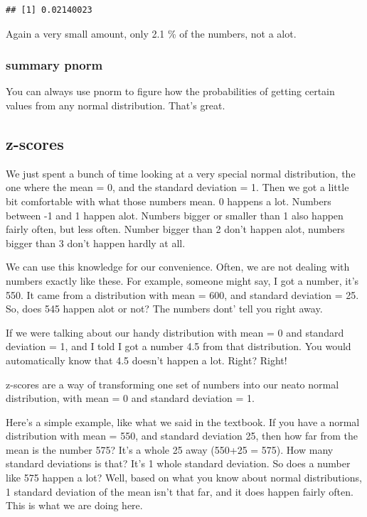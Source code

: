 \documentclass[]{book}
\theoremstyle{definition}
\theoremstyle{definition}
\theoremstyle{definition}
\theoremstyle{remark}
\begin{document}
\begin{verbatim}
## [1] 0.02140023
\end{verbatim}

Again a very small amount, only 2.1 \% of the numbers, not a alot.

\subsubsection{summary pnorm}\label{summary-pnorm}

You can always use pnorm to figure how the probabilities of getting
certain values from any normal distribution. That's great.

\subsection{z-scores}\label{z-scores}

We just spent a bunch of time looking at a very special normal
distribution, the one where the mean = 0, and the standard deviation =
1. Then we got a little bit comfortable with what those numbers mean. 0
happens a lot. Numbers between -1 and 1 happen alot. Numbers bigger or
smaller than 1 also happen fairly often, but less often. Number bigger
than 2 don't happen alot, numbers bigger than 3 don't happen hardly at
all.

We can use this knowledge for our convenience. Often, we are not dealing
with numbers exactly like these. For example, someone might say, I got a
number, it's 550. It came from a distribution with mean = 600, and
standard deviation = 25. So, does 545 happen alot or not? The numbers
dont' tell you right away.

If we were talking about our handy distribution with mean = 0 and
standard deviation = 1, and I told I got a number 4.5 from that
distribution. You would automatically know that 4.5 doesn't happen a
lot. Right? Right!

z-scores are a way of transforming one set of numbers into our neato
normal distribution, with mean = 0 and standard deviation = 1.

Here's a simple example, like what we said in the textbook. If you have
a normal distribution with mean = 550, and standard deviation 25, then
how far from the mean is the number 575? It's a whole 25 away (550+25 =
575). How many standard deviations is that? It's 1 whole standard
deviation. So does a number like 575 happen a lot? Well, based on what
you know about normal distributions, 1 standard deviation of the mean
isn't that far, and it does happen fairly often. This is what we are
doing here.
\end{document}
